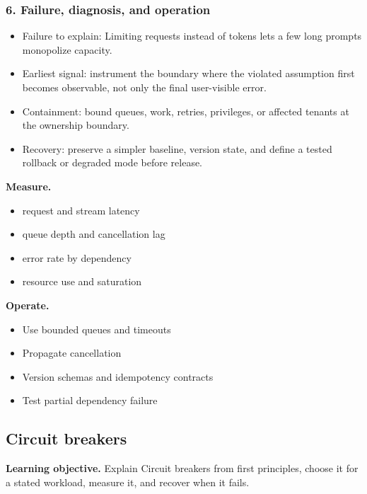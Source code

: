 \subsubsection*{6. Failure, diagnosis, and operation}
\begin{itemize}
\item Failure to explain: Limiting requests instead of tokens lets a few long prompts monopolize capacity.
\item Earliest signal: instrument the boundary where the violated assumption first becomes observable, not only the final user-visible error.
\item Containment: bound queues, work, retries, privileges, or affected tenants at the ownership boundary.
\item Recovery: preserve a simpler baseline, version state, and define a tested rollback or degraded mode before release.
\end{itemize}
\textbf{Measure.}\begin{itemize}
\item request and stream latency
\item queue depth and cancellation lag
\item error rate by dependency
\item resource use and saturation
\end{itemize}
\textbf{Operate.}\begin{itemize}
\item Use bounded queues and timeouts
\item Propagate cancellation
\item Version schemas and idempotency contracts
\item Test partial dependency failure
\end{itemize}
\subsection{Circuit breakers}
\textbf{Learning objective.} Explain Circuit breakers from first principles, choose it for a stated workload, measure it, and recover when it fails.
